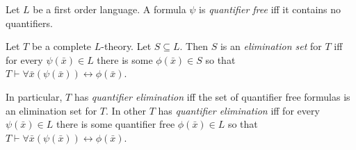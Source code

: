 \documentclass[12pt]{article}
\begin{document}
Let $L$ be a first order language. 
A formula $\psi$ is {\em quantifier free} iff it contains no quantifiers.

\medskip

Let $T$ be a complete $L$-theory. Let $S \subseteq L$. Then $S$ is an {\em elimination set} for $T$ iff 
for every $\psi(\bar{x}) \in L$ there is some $\phi(\bar{x}) \in S$ so that 
$T \vdash \forall \bar{x} (\psi(\bar{x})) \leftrightarrow \phi(\bar{x})$.

\medskip

In particular, $T$ has {\em quantifier elimination} iff the set of quantifier free formulas is an elimination set for $T$. 
In other  $T$ has {\em quantifier elimination} iff
for every $\psi(\bar{x}) \in L$ there is some quantifier free $\phi(\bar{x}) \in L$ so that 
$T \vdash \forall \bar{x} (\psi(\bar{x})) \leftrightarrow \phi(\bar{x})$.
\end{document}
